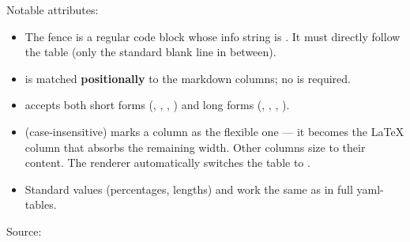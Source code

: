 \documentclass[a4paper,twoside]{article}
\begin{document}
Notable attributes:
\begin{itemize}
\item The fence is a regular code block whose info string is .
It must directly follow the table (only the standard blank line in
between).
\item {} is matched \textbf{positionally} to the markdown columns; no 
is required.
\item {} accepts both short forms (, , , ) and long forms
(, , , ).
\item {} (case-insensitive) marks a column as the flexible one --- it
becomes the \LaTeX{}  column that absorbs the remaining width. Other
columns size to their content. The renderer automatically switches the
table to .
\item Standard  values (percentages, lengths) and  work
the same as in full yaml-tables.
\end{itemize}
Source:
\end{document}
